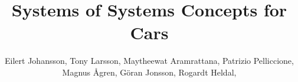 \documentclass{llncs}
\begin{document}
%
\frontmatter          %
%
\pagestyle{headings}  %

\mainmatter              %
%
\title{Systems of Systems Concepts for Cars}
%
%



\author{
Eilert Johansson,
Tony Larsson,
Maytheewat Aramrattana,
Patrizio Pelliccione,
Magnus \AA gren,
G\"oran Jonsson,
Rogardt Heldal,
}




%
%
%
\institute{Next Generation Electrical Architecture (NGEA) project\\VINNOVA Diarienummer 2014-05599 \\%
}


\end{document}

